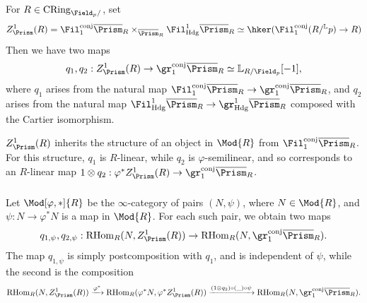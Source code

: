 \documentclass[10pt]{amsart}
\begin{document}
\subsubsection{}
For $R\in \mathrm{CRing}_{\Field_p/}$, set
\[
Z^1_{\Prism}(R) = \Fil^{\mathrm{conj}}_1\overline{\Prism}_R\times_{\overline{\Prism}_R}\Fil^1_{\mathrm{Hdg}}\overline{\Prism}_R\simeq\hker(\Fil_1^{\mathrm{conj}}(R/^{\mathbb{L}}p)\to R)
\]
Then we have two maps
\[
q_1,q_2:Z^1_{\Prism}(R) \to \gr_1^{\mathrm{conj}}\overline{\Prism}_R\simeq \mathbb{L}_{R/\Field_p}[-1],
\]
where $q_1$ arises from the natural map $\Fil_1^{\mathrm{conj}}\overline{\Prism}_R\to \gr_1^{\mathrm{conj}}\overline{\Prism}_R$, and $q_2$ arises from the natural map $ \Fil_{\mathrm{Hdg}}^1\overline{\Prism}_R\to \gr^1_{\mathrm{Hdg}}\overline{\Prism}_R$ composed with the Cartier isomorphism. 



$Z^1_{\Prism}(R)$ inherits the structure of an object in $\Mod{R}$ from $\Fil_1^{\mathrm{conj}}\overline{\Prism}_R$. For this structure, $q_1$ is $R$-linear, while $q_2$ is $\varphi$-semilinear, and so corresponds to an $R$-linear map $1\otimes q_2:\varphi^*Z^1_{\Prism}(R)\to \gr_1^{\mathrm{conj}}\overline{\Prism}_R$. 

\subsubsection{}
Let $\Mod[\varphi,*]{R}$ be the $\infty$-category of pairs $(N,\psi)$, where $N\in \Mod{R}$, and $\psi:N\to \varphi^* N$ is a map in $\Mod{R}$. For each such pair, we obtain two maps
\[
q_{1,\psi},q_{2,\psi}:\mathrm{RHom}_R(N,Z^1_{\Prism}(R))\to \mathrm{RHom}_R(N,\gr_1^{\mathrm{conj}}\overline{\Prism}_R).
\]
The map $q_{1,\psi}$ is simply postcomposition with $q_1$, and is independent of $\psi$, while the second is the composition
\[
\mathrm{RHom}_R(N,Z^1_{\Prism}(R))\xrightarrow{\varphi^*} \mathrm{RHom}_R(\varphi^*N,\varphi^* Z^1_{\Prism}(R))\xrightarrow{(1\otimes q_2)\circ(\_)\circ \psi}\mathrm{RHom}_R(N,\gr_1^{\mathrm{conj}}\overline{\Prism}_R).
\]
\end{document}
